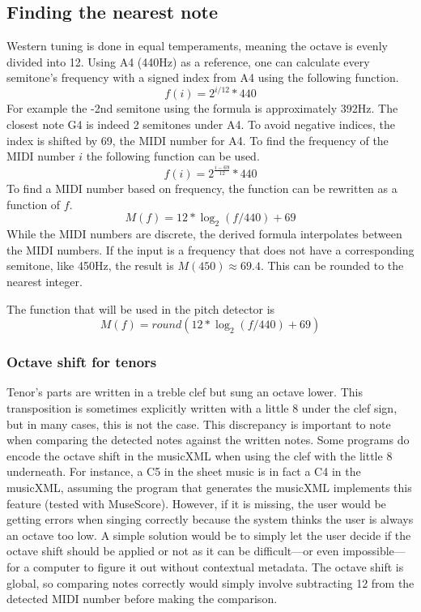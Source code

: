 \subsection{Finding the nearest note}
Western tuning is done in equal temperaments, meaning the octave is evenly divided into 12. Using A4 (440Hz) as a reference, one can calculate every semitone's frequency with a signed index from A4 using the following function. 
$$f(i) = 2^{i/12}*440$$
For example the -2nd semitone using the formula is approximately 392Hz. The closest note G4 is indeed 2 semitones under A4. To avoid negative indices, the index is shifted by 69, the MIDI number for A4. To find the frequency of the MIDI number $i$ the following function can be used.
$$f(i) = 2^{\frac{i-69}{12}}*440$$
To find a MIDI number based on frequency, the function can be rewritten as a function of $f$.
$$M(f) = 12*\log_2(f/440)+69$$
While the MIDI numbers are discrete, the derived formula interpolates between the MIDI numbers. If the input is a frequency that does not have a corresponding semitone, like 450Hz, the result is $M(450) \approx 69.4$. This can be rounded to the nearest integer.

The function that will be used in the pitch detector is
$$M(f) = round(12*\log_2(f/440)+69)$$

\subsubsection{Octave shift for tenors}
Tenor's parts are written in a treble clef but sung an octave lower. This transposition is sometimes explicitly written with a little 8 under the clef sign, but in many cases, this is not the case. This discrepancy is important to note when comparing the detected notes against the written notes. Some programs do encode the octave shift in the musicXML when using the clef with the little 8 underneath. For instance, a C5 in the sheet music is in fact a C4 in the musicXML, assuming the program that generates the musicXML implements this feature (tested with MuseScore). However, if it is missing, the user would be getting errors when singing correctly because the system thinks the user is always an octave too low. A simple solution would be to simply let the user decide if the octave shift should be applied or not as it can be difficult—or even impossible—for a computer to figure it out without contextual metadata. The octave shift is global, so comparing notes correctly would simply involve subtracting 12 from the detected MIDI number before making the comparison.

